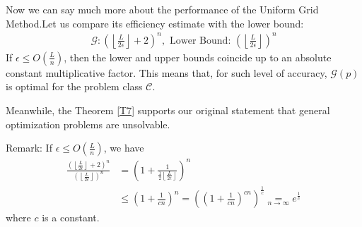 Now we can say much more about the performance of the Uniform Grid Method.Let us compare its efficiency estimate with the lower bound:
\begin{align*}
    \mathcal{G}:\left( \left\lfloor \frac{L}{2\epsilon} \right\rfloor +2 \right)^n, \text{ Lower Bound: }\left( \left\lfloor \frac{L}{2\epsilon} \right\rfloor \right)^n
\end{align*}
If $\epsilon\le O(\frac{L}{n})$, then the lower and upper bounds coincide up to an absolute constant multiplicative factor. This means that, for such level of accuracy, $\mathcal{G}(p)$ is optimal for the problem class $\mathcal{C}$. 

Meanwhile, the Theorem \ref{T7} supports our original statement that general optimization problems are unsolvable.

Remark: If $\epsilon\le O(\frac{L}{n})$, we have
\begin{align*}
    \frac{\left( \left\lfloor \frac{L}{2\epsilon} \right\rfloor +2 \right)^n}{\left( \left\lfloor \frac{L}{2\epsilon} \right\rfloor \right)^n}&=\left( 1+\frac{1}{\frac{1}{2}\left\lfloor \frac{L}{2\epsilon} \right\rfloor} \right)^n \\
    &\le \left( 1+\frac{1}{cn} \right)^n=\left( \left( 1+\frac{1}{cn} \right)^{cn} \right)^{\frac{1}{c}} \underset{n\to \infty}{=}e^{\frac{1}{c}}
\end{align*}
where $c$ is a constant. 
